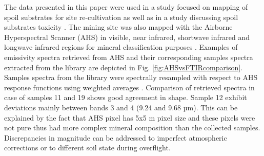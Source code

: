The data presented in this paper were used in a study focused on mapping of spoil substrates for site re-cultivation \cite{Z14} as well as in a study discussing spoil substrates toxicity \cite{FK05}. The mining site was also mapped with the Airborne Hyperspectral Scanner (AHS) in visible, near infrared, shortwave infrared and longwave infrared regions for mineral classification purposes \cite{NK14}. Examples of emissivity spectra retrieved from AHS and their corresponding samples spectra extracted from the library are depicted in Fig. \ref{fig:AHSvsFTIRcomparison}. Samples spectra from the library were spectrally resampled with respect to AHS response functions using weighted averages \cite{LT13}. Comparison of retrieved spectra in case of samples 11 and 19 shows good agreement in shape. Sample 12 exhibit deviations mainly between bands 3 and 4 (9.24 and 9.68 µm). This can be explained by the fact that AHS pixel has 5x5 m pixel size and these pixels were not pure thus had more complex mineral composition than the collected samples. Discrepancies in magnitude can be addressed to imperfect atmospheric corrections or to different soil state during overflight.

